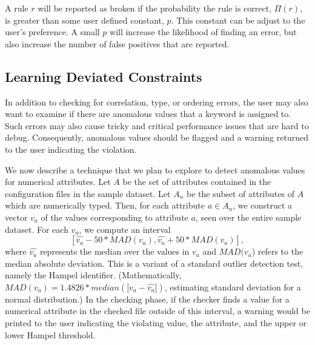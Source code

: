 

A rule $r$ will be reported as broken if the probability the rule is
correct, $\Pi(r)$, is greater than some user defined constant, $p$. This
constant can be adjust to the user's preference. A small $p$ will
increase the likelihood of finding an error, but also increase the
number of false positives that are reported.
\fi

\subsection{Learning Deviated Constraints}
\label{subsec-constraints}

In addition to checking for correlation, type, or ordering errors, 
the user may also want to examine if there are anomalous values that 
a keyword is assigned to. Such errors may also cause tricky and critical performance issues that are hard to debug.
Consequently, anomalous values should be flagged and a warning returned
to the user indicating the violation.

We now describe a technique that we plan to 
explore to detect anomalous values for 
numerical attributes. Let $A$ be the set of attributes contained in the 
configuration files in the sample dataset. 
Let $A_n$ be the subset of attributes of $A$ which are numerically typed. 
Then, for each attribute $a \in A_n$, we construct a vector $v_a$ of the 
values corresponding to attribute $a$, seen over the entire sample dataset.
For each $v_a$, we compute 
an interval  $$[\hat{v_a} - 50*MAD(v_a), \hat{v_a} + 50*MAD(v_a)],$$ 
where $\hat{v_a}$ represents the median over the values 
in $v_a$ and $MAD(v_a$) refers to the 
median absolute deviation. 
This is a variant of a standard outlier detection test, namely the Hampel identifier. (Mathematically, $MAD(v_a) = 1.4826* median(|v_a - \hat{v_a}|)$, estimating standard deviation 
for a normal distribution.) 
In the checking phase, if the checker finds a value for a numerical 
attribute in the checked file outside of this interval, 
a warning would be printed to the user indicating the violating value, 
the attribute, and the upper or lower Hampel threshold. 

